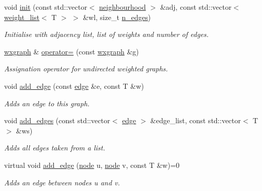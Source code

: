 \begin{DoxyCompactItemize}
void \hyperlink{classlgraph_1_1wxgraph_a851ab43d7658c185831413394ef915a9}{init} (const std\+::vector$<$ \hyperlink{namespacelgraph_a052e7766c13f3a43cec0aec8173fdede}{neighbourhood} $>$ \&adj, const std\+::vector$<$ \hyperlink{namespacelgraph_a1e0fd5ef0a78b2a92da48adbed265cb6}{weight\+\_\+list}$<$ T $>$ $>$ \&wl, size\+\_\+t \hyperlink{classlgraph_1_1xxgraph_af00bce8b07a42754601d1e3bebe2c1fa}{n\+\_\+edges})
\begin{DoxyCompactList}\small\item\em Initialise with adjacency list, list of weights and number of edges. \end{DoxyCompactList}\item 
\hyperlink{classlgraph_1_1wxgraph}{wxgraph} \& \hyperlink{classlgraph_1_1wxgraph_a205fb7f32445d4caa36ee47609103e47}{operator=} (const \hyperlink{classlgraph_1_1wxgraph}{wxgraph} \&g)
\begin{DoxyCompactList}\small\item\em Assignation operator for undirected weighted graphs. \end{DoxyCompactList}\item 
void \hyperlink{classlgraph_1_1wxgraph_a6b2aab113f6ce118ff437c6c182d9c6c}{add\+\_\+edge} (const \hyperlink{namespacelgraph_a76bd7d50719f03de7a85db259d80d572}{edge} \&e, const T \&w)
\begin{DoxyCompactList}\small\item\em Adds an edge to this graph. \end{DoxyCompactList}\item 
void \hyperlink{classlgraph_1_1wxgraph_a73b0fd5a842fcc862e32e293901892ec}{add\+\_\+edges} (const std\+::vector$<$ \hyperlink{namespacelgraph_a76bd7d50719f03de7a85db259d80d572}{edge} $>$ \&edge\+\_\+list, const std\+::vector$<$ T $>$ \&ws)
\begin{DoxyCompactList}\small\item\em Adds all edges taken from a list. \end{DoxyCompactList}\item 
virtual void \hyperlink{classlgraph_1_1wxgraph_ab3a4257d69654f2e778fc253eccd4cf1}{add\+\_\+edge} (\hyperlink{namespacelgraph_a397169dd66adf725210a30fb7251773e}{node} u, \hyperlink{namespacelgraph_a397169dd66adf725210a30fb7251773e}{node} v, const T \&w)=0
\begin{DoxyCompactList}\small\item\em Adds an edge between nodes {\itshape u} and {\itshape v}. \end{DoxyCompactList}\item 

\end{DoxyCompactItemize}

